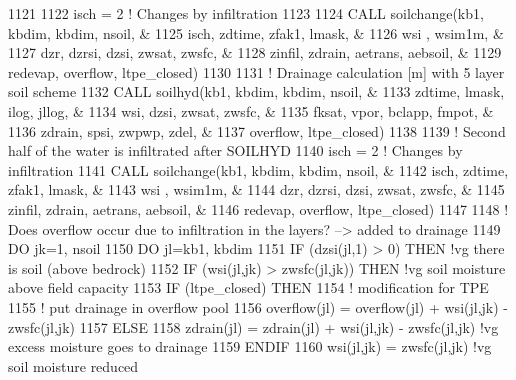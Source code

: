 \begin{DoxyCode}
{{1121 
1122       isch = 2     \textcolor{comment}{! Changes by infiltration}
1123 
1124       \textcolor{keyword}{CALL }soilchange(kb1, kbdim, kbdim, nsoil,     &
1125             isch, zdtime, zfak1, lmask,             &
1126             wsi , wsim1m,                           &
1127             dzr, dzrsi,    dzsi, zwsat, zwsfc,      &
1128             zinfil, zdrain, aetrans, aebsoil,       &
1129             redevap, overflow, ltpe\_closed)
1130 
1131       \textcolor{comment}{! Drainage calculation [m] with 5 layer soil scheme}
1132       \textcolor{keyword}{CALL }soilhyd(kb1, kbdim, kbdim, nsoil,      &
1133            zdtime, lmask, ilog, jllog,            &
1134            wsi, dzsi, zwsat, zwsfc,               &
1135            fksat, vpor, bclapp, fmpot,            &
1136            zdrain, spsi, zwpwp, zdel,             &
1137            overflow, ltpe\_closed)
1138 
1139       \textcolor{comment}{! Second half of the water is infiltrated after SOILHYD}
1140       isch = 2     \textcolor{comment}{! Changes by infiltration}
1141       \textcolor{keyword}{CALL }soilchange(kb1, kbdim, kbdim, nsoil,     &
1142             isch, zdtime, zfak1, lmask,             &
1143             wsi , wsim1m,                           &
1144             dzr, dzrsi,    dzsi, zwsat, zwsfc,      &
1145             zinfil, zdrain, aetrans, aebsoil,       &
1146             redevap, overflow, ltpe\_closed)
1147 
1148       \textcolor{comment}{! Does overflow occur due to infiltration in the layers? --> added to drainage}
1149       \textcolor{keywordflow}{DO} jk=1, nsoil
1150         \textcolor{keywordflow}{DO} jl=kb1, kbdim
1151           \textcolor{keywordflow}{IF} (dzsi(jl,1) > 0) \textcolor{keywordflow}{THEN}                                     \textcolor{comment}{!vg  there is soil (above bedrock)}
1152             \textcolor{keywordflow}{IF} (wsi(jl,jk) > zwsfc(jl,jk)) \textcolor{keywordflow}{THEN}                        \textcolor{comment}{!vg  soil moisture above field
       capacity}
1153               \textcolor{keywordflow}{IF} (ltpe\_closed) \textcolor{keywordflow}{THEN}
1154                 \textcolor{comment}{! modification for TPE}
1155                 \textcolor{comment}{! put drainage in overflow pool}
1156                 overflow(jl) = overflow(jl) + wsi(jl,jk) - zwsfc(jl,jk)
1157               \textcolor{keywordflow}{ELSE}
1158                 zdrain(jl) = zdrain(jl) + wsi(jl,jk) - zwsfc(jl,jk)    \textcolor{comment}{!vg  excess moisture goes to
       drainage}
1159 \textcolor{keywordflow}{              ENDIF}
1160               wsi(jl,jk) = zwsfc(jl,jk)                                \textcolor{comment}{!vg  soil moisture reduced
}}}
\end{DoxyCode}
